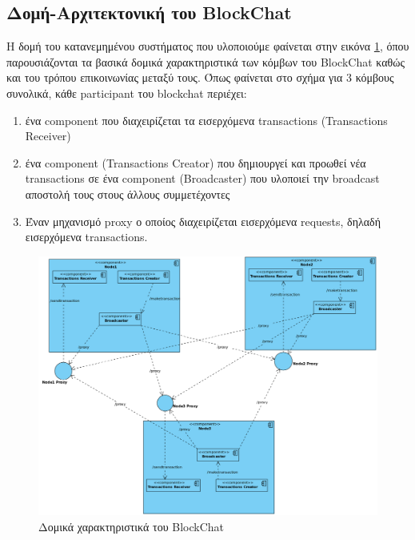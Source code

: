\documentclass[12pt, a4paper]{article}
\begin{document}
	\subsection{Δομή-Αρχιτεκτονική του BlockChat}
	Η δομή του κατανεμημένου συστήματος που υλοποιούμε φαίνεται στην εικόνα \ref{fig:components}, όπου παρουσιάζονται τα βασικά δομικά χαρακτηριστικά των κόμβων του BlockChat καθώς και του τρόπου επικοινωνίας μεταξύ τους. Όπως φαίνεται στο σχήμα για 3 κόμβους συνολικά, κάθε participant του blockchat περιέχει:
	\begin{enumerate}
		\item ένα component που διαχειρίζεται τα εισερχόμενα transactions (Transactions Receiver)
		\item ένα component (Transactions Creator) που δημιουργεί και προωθεί νέα transactions σε ένα component (Broadcaster) που υλοποιεί την broadcast αποστολή τους στους άλλους συμμετέχοντες
		\item Έναν μηχανισμό proxy ο οποίος διαχειρίζεται εισερχόμενα requests, δηλαδή εισερχόμενα transactions.
	\end{enumerate}
		\begin{figure}[h!]
		\centering
		\includegraphics[width=6.5in]{components.png}
		\caption{Δομικά χαρακτηριστικά του BlockChat}
		\label{fig:components}
	\end{figure}
\end{document}
